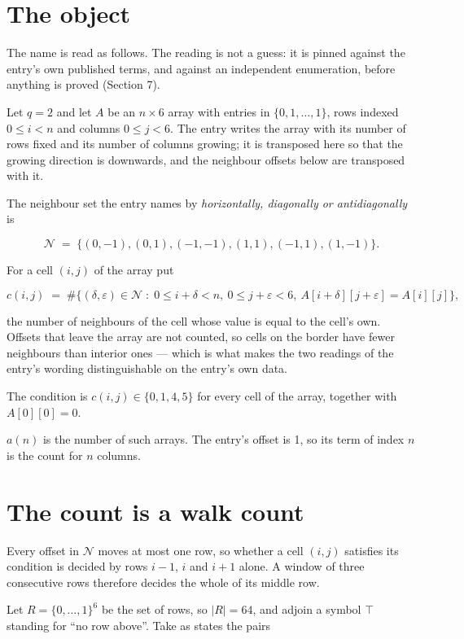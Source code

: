 \documentclass[11pt]{article}
\theoremstyle{definition}
\begin{document}
\section{The object}

The name is read as follows. The reading is not a guess: it is pinned against the entry's own published terms, and against an independent enumeration, before anything is proved (Section 7).

Let $q = 2$ and let $A$ be an $n \times 6$ array with entries in $\{0,1,\dots,1\}$, rows indexed $0 \le i < n$ and columns $0 \le j < 6$. The entry writes the array with its number of rows fixed and its number of columns growing; it is transposed here so that the growing direction is downwards, and the neighbour offsets below are transposed with it.

The neighbour set the entry names by {\itshape horizontally, diagonally or antidiagonally} is

\[\mathcal{N} \;=\; \{(0,-1), (0,1), (-1,-1), (1,1), (-1,1), (1,-1)\}.\]

For a cell $(i,j)$ of the array put

\[c(i,j) \;=\; \#\bigl\{(\delta,\varepsilon)\in\mathcal{N} \;:\; 0\le i+\delta<n,\ 0\le j+\varepsilon<6,\ A[i+\delta][j+\varepsilon] = A[i][j]\bigr\},\]

the number of neighbours of the cell whose value is equal to the cell's own. Offsets that leave the array are not counted, so cells on the border have fewer neighbours than interior ones --- which is what makes the two readings of the entry's wording distinguishable on the entry's own data.

The condition is $c(i,j) \in \{0, 1, 4, 5\}$ for every cell of the array, together with $A[0][0]=0$.

$a(n)$ is the number of such arrays. The entry's offset is 1, so its term of index $n$ is the count for $n$ columns.

\section{The count is a walk count}

Every offset in $\mathcal{N}$ moves at most one row, so whether a cell $(i,j)$ satisfies its condition is decided by rows $i-1$, $i$ and $i+1$ alone. A window of three consecutive rows therefore decides the whole of its middle row.

Let $R = \{0,\dots,1\}^{6}$ be the set of rows, so $|R| = 64$, and adjoin a symbol $\top$ standing for ``no row above''. Take as states the pairs
\end{document}
